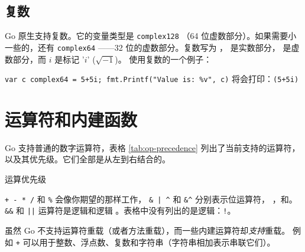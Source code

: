 \subsection{复数}
Go 原生支持复数。它的变量类型是 \lstinline{complex128}
（64 位虚数部分）。如果需要小一些的，还有 \lstinline{complex64}
——32 位的虚数部分。复数写为 ， 是实数部分，
 是虚数部分，而 $i$ 是标记 '$i$' ($\sqrt{-1}$)。
使用复数的一个例子：

\lstinline{var c complex64 = 5+5i; fmt.Printf("Value is: %v", c)}\newline
将会打印：\lstinline{(5+5i)}

\section{运算符和内建函数}
Go 支持普通的数字运算符，表格 \ref{tab:op-precedence} 列出了当前支持的运算符，
以及其优先级。它们全部是从左到右结合的。

\begin{table}[H]
\begin{center}
\caption{运算优先级}
\label{tab:op-precedence}

\end{center}
\end{table}
\verb|+ - * /| 和 \verb|%| 会像你期望的那样工作，
\verb!& | ^!
和 \verb!&^! 分别表示位运算符，
，和。
\verb|&&| 和 \verb/||/ 运算符是逻辑和逻辑
。表格中没有列出的是逻辑：\verb/!/。

虽然 Go 不支持运算符重载（或者方法重载），而一些内建运算符却\emph{支持}重载。
例如 \texttt{+} 可以用于整数、浮点数、复数和字符串（字符串相加表示串联它们）。

